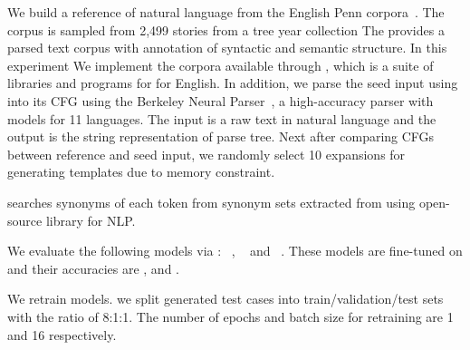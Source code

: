 %
We build a reference \Cfg of natural language from the English Penn
\Trb corpora~\cite{mitchell1993treebank,nltkTreebankCorporaWebPage}.
The corpus is sampled from 2,499 stories from a tree year \Wsj
collection The \Trb provides a parsed text corpus with annotation of
syntactic and semantic structure. In this experiment We implement the
\trb corpora available through \Nltk, which is a suite of libraries
and programs for \Nlp for English. In addition, we parse the seed
input using into its CFG using the Berkeley Neural
Parser~\cite{kitaev2018constituency, kitaev2019multilingual}, a
high-accuracy parser with models for 11 languages. The input is a raw
text in natural language and the output is the string representation of
parse tree. Next after comparing CFGs between reference and seed input,
we randomly select 10 expansions for generating templates due to
memory constraint.

%
\Model searches synonyms of each token from synonym sets extracted
from \Wrdnt using \Spacy open-source library for NLP.

%
We evaluate the following \sa models via \Model:
\Bert~\cite{devlin2019bert}, \Roberta~\cite{liu2019roberta} and
\Dbert~\cite{sanh2019distilbert}. These models are fine-tuned on \Sstt
and their accuracies are \BertAcc, \RobertaAcc and \DbertAcc.

%
We retrain \sa models. we split \Model generated test cases into
train/validation/test sets with the ratio of 8:1:1. The number of
epochs and batch size for retraining are 1 and 16 respectively.
